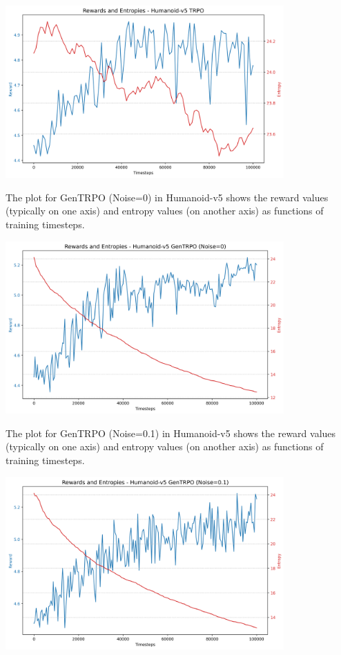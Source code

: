 \documentclass{svproc}
\begin{document}
\begin{center}
\includegraphics[width=0.8\textwidth]{graph_Humanoid-v5_trpo_rewards_entropies.png}
\end{center}

The plot for GenTRPO (Noise=0) in Humanoid-v5 shows the reward values (typically on one axis) and entropy values (on another axis) as functions of training timesteps.

\begin{center}
\includegraphics[width=0.8\textwidth]{graph_Humanoid-v5_gentrpo_rewards_entropies.png}
\end{center}

The plot for GenTRPO (Noise=0.1) in Humanoid-v5 shows the reward values (typically on one axis) and entropy values (on another axis) as functions of training timesteps.

\begin{center}
\includegraphics[width=0.8\textwidth]{graph_Humanoid-v5_gentrpo-ne_rewards_entropies.png}
\end{center}
\end{document}
